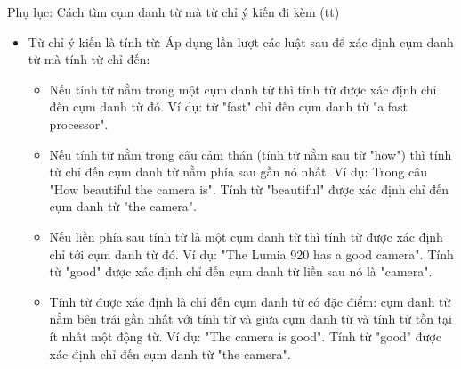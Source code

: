 \documentclass[9pt,xcolor=table,hyperref=unicode]{beamer}
\begin{document}
		\begin{frame}{Phụ lục: Cách tìm cụm danh từ mà từ chỉ ý kiến đi kèm (tt)}
			\begin{itemize}				
				\item{Từ chỉ ý kiến là tính từ: 
				Áp dụng lần lượt các luật sau để xác định cụm danh từ mà tính từ chỉ đến:
					\begin{itemize}
						\itemsep0.8em
						\item{Nếu tính từ nằm trong một cụm danh từ thì tính từ được xác định chỉ đến cụm danh từ đó. Ví dụ: từ "fast" chỉ đến cụm danh từ "a fast processor".}
						\item{Nếu tính từ nằm trong câu cảm thán (tính từ nằm sau từ "how") thì tính từ chỉ đến cụm danh từ nằm phía sau gần nó nhất. Ví dụ: Trong câu "How beautiful the camera is". Tính từ "beautiful" được xác định chỉ đến cụm danh từ "the camera".}
						\item{Nếu liền phía sau tính từ là một cụm danh từ thì tính từ được xác định chỉ tới cụm danh từ đó. Ví dụ: "The Lumia 920 has a good camera". Tính từ "good" được xác định chỉ đến cụm danh từ liền sau nó là "camera".}
						\item{Tính từ được xác định là chỉ đến cụm danh từ có đặc điểm: cụm danh từ nằm bên trái gần nhất với tính từ và giữa cụm danh từ và tính từ tồn tại ít nhất một động từ. Ví dụ: "The camera is good". Tính từ "good" được xác định chỉ đến cụm danh từ "the camera".}
					\end{itemize}}
			\end{itemize}
		\end{frame}
\end{document}
